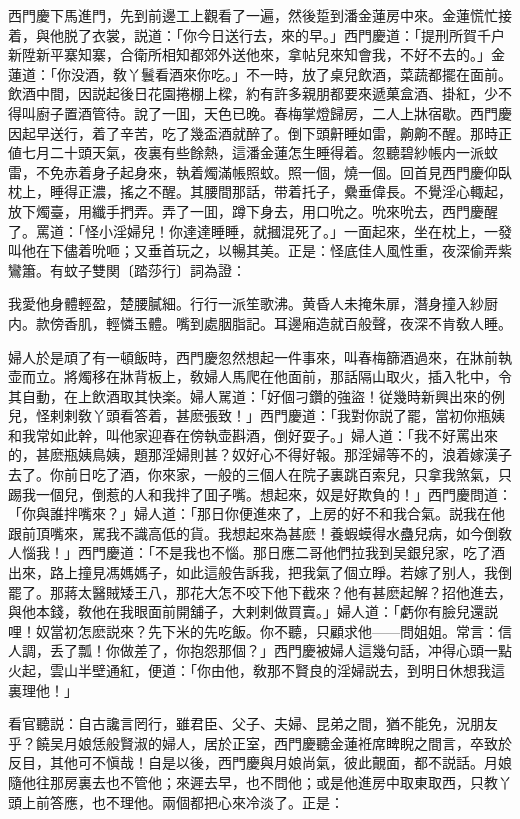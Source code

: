 西門慶下馬進門，先到前邊工上觀看了一遍，然後踅到潘金蓮房中來。金蓮慌忙接着，與他脱了衣裳，説道：「你今日送行去，來的早。」西門慶道：「提刑所賀千户新陞新平寨知寨，合衛所相知都郊外送他來，拿帖兒來知會我，不好不去的。」金蓮道：「你没酒，敎丫鬟看酒來你吃。」不一時，放了桌兒飲酒，菜蔬都擺在面前。飲酒中間，因説起後日花園捲棚上樑，約有許多親朋都要來遞菓盒酒、掛紅，少不得叫廚子置酒管待。說了一囬，天色已晚。春梅掌燈歸房，二人上牀宿歇。西門慶因起早送行，着了辛苦，吃了幾盃酒就醉了。倒下頭鼾睡如雷，齁齁不醒。那時正値七月二十頭天氣，夜裏有些餘熱，這潘金蓮怎生睡得着。忽聽碧紗帳内一派蚊雷，不免赤着身子起身來，執着燭滿帳照蚊。照一個，燒一個。回首見西門慶仰臥枕上，睡得正濃，搖之不醒。其腰間那話，带着托子，纍垂偉長。不覺淫心輙起，放下燭臺，用纖手捫弄。弄了一囬，蹲下身去，用口吮之。吮來吮去，西門慶醒了。罵道：「怪小淫婦兒！你達達睡睡，就摑混死了。」一面起來，坐在枕上，一發叫他在下儘着吮咂；又垂首玩之，以暢其美。正是：怪底佳人風性重，夜深偷弄紫鸞簫。有蚊子雙関〔踏莎行〕詞為證：

\begin{myquote}
我愛他身體輕盈，楚腰膩細。行行一派笙歌沸。黄昏人未掩朱扉，潛身撞入紗厨内。款傍香肌，輕憐玉體。嘴到處胭脂記。耳邊廂造就百般聲，夜深不肯敎人睡。
\end{myquote}

婦人於是頑了有一頓飯時，西門慶忽然想起一件事來，叫春梅篩酒過來，在牀前執壶而立。將燭移在牀背板上，敎婦人馬爬在他面前，那話隔山取火，插入牝中，令其自動，在上飲酒取其快楽。婦人駡道：「好個刁鑽的強盜！従幾時新興出來的例兒，怪剌剌敎丫頭看答着，甚麽張致！」西門慶道：「我對你説了罷，當初你瓶姨和我常如此幹，叫他家迎春在傍執壶斟酒，倒好耍子。」婦人道：「我不好罵出來的，甚麽瓶姨鳥姨，題那淫婦則甚？奴好心不得好報。那淫婦等不的，浪着嫁漢子去了。你前日吃了酒，你來家，一般的三個人在院子裏跳百索兒，只拿我煞氣，只踢我一個兒，倒惹的人和我拌了囬子嘴。想起來，奴是好欺負的！」西門慶問道：「你與誰拌嘴來？」婦人道：「那日你便進來了，上房的好不和我合氣。説我在他跟前頂嘴來，駡我不識高低的貨。我想起來為甚麽！養蝦蟆得水蠱兒病，如今倒敎人惱我！」西門慶道：「不是我也不惱。那日應二哥他們拉我到吴銀兒家，吃了酒出來，路上撞見馮媽媽子，如此這般告訴我，把我氣了個立睜。若嫁了别人，我倒罷了。那蔣太醫賊矮王八，那花大怎不咬下他下截來？他有甚麽起解？招他進去，與他本錢，敎他在我眼面前開舖子，大剌剌做買賣。」婦人道：「虧你有臉兒還説哩！奴當初怎麽説來？先下米的先吃飯。你不聽，只顧求他——問姐姐。常言：信人調，丢了瓢！你做差了，你抱怨那個？」西門慶被婦人這幾句話，冲得心頭一點火起，雲山半壁通紅，便道：「你由他，敎那不賢良的淫婦説去，到明日休想我這裏理他！」

看官聽説：自古讒言罔行，雖君臣、父子、夫婦、昆弟之間，猶不能免，況朋友乎？饒吴月娘恁般賢淑的婦人，居於正室，西門慶聽金蓮袵席睥睨之間言，卒致於反目，其他可不愼哉！自是以後，西門慶與月娘尚氣，彼此覿面，都不説話。月娘隨他往那房裏去也不管他；來遲去早，也不問他；或是他進房中取東取西，只教丫頭上前答應，也不理他。兩個都把心來冷淡了。正是：

